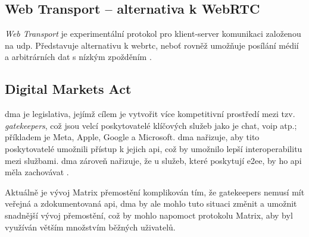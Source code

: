 \subsection{Web Transport -- alternativa k WebRTC}

\textit{Web Transport} je experimentální protokol pro klient-server komunikaci
založenou na \gls{udp}. Představuje alternativu k \gls{webrtc}, neboť rovněž
umožňuje posílání médií a arbitrárních dat s nízkým zpožděním
\parencite{GitHub-WebTransport-Explainer}.

\subsection{Digital Markets Act}\label{dma}

\gls{dma} je legislativa, jejímž cílem je vytvořit více kompetitivní prostředí
mezi tzv. \textit{gatekeepers}, což jsou velcí poskytovatelé klíčových služeb
jako je chat, \gls{voip} atp.; příkladem je Meta, Apple, Google a Microsoft.
\gls{dma} nařizuje, aby tito poskytovatelé umožnili přístup k jejich \gls{api},
což by umožnilo lepší interoperabilitu mezi službami. \gls{dma} zároveň
nařizuje, že u služeb, které poskytují \gls{e2ee}, by ho \gls{api} měla
zachovávat \parencite{Element-AGuideToNavigateTheDMA}.

Aktuálně je vývoj Matrix přemostění komplikován tím, že gatekeepers nemusí mít
veřejná a zdokumentovaná \gls{api}, \gls{dma} by ale mohlo tuto situaci změnit a
umožnit snadnější vývoj přemostění, což by mohlo napomoct protokolu Matrix, aby
byl využíván větším množstvím běžných uživatelů.
